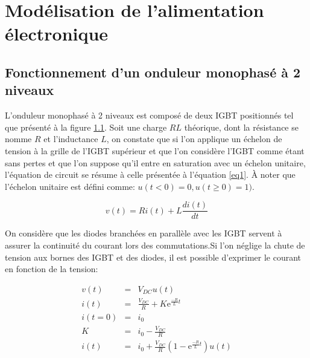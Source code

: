 \documentclass[11pt,letterpaper,final]{report}
\begin{document}
\chapter{Modélisation de l'alimentation électronique}
\section{Fonctionnement d'un onduleur monophasé à 2 niveaux}
L'onduleur monophasé à 2 niveaux est composé de deux IGBT positionnés tel que présenté à la figure \ref{}. Soit une charge $RL$ théorique, dont la résistance se nomme $R$ et l'inductance $L$, on constate que si l'on applique un échelon de tension à la grille de l'IGBT supérieur et que l'on considère l'IGBT comme étant sans pertes et que l'on suppose qu'il entre en saturation avec un échelon unitaire, l'équation de circuit se résume à celle présentée à l'équation \ref{eq1}. À noter que l'échelon unitaire est défini comme: $u(t<0) = 0, u(t\geq 0) = 1)$.

\begin{equation}
\label{eq1}
v(t) = R i(t) + L \frac{d i(t)}{dt}
\end{equation}

On considère que les diodes branchées en parallèle avec les IGBT servent à assurer la continuité du courant lors des commutations.Si l'on néglige la chute de tension aux bornes des IGBT et des diodes, il est possible d'exprimer le courant en fonction de la tension:

\begin{eqnarray}
v(t) &=& V_{DC} u(t)\\
i(t) &=& \frac{V_{DC}}{R} + K \mbox{e}^{\frac{-R}{L}t}\\
i(t=0) &=& i_0\\
K &=& i_0 - \frac{V_{DC}}{R} \\
i(t) &=& i_0  + \frac{V_{DC}}{R}\left(1 - \mbox{e}^{\frac{-R}{L}t}\right)u(t)
\end{eqnarray}
\end{document}
